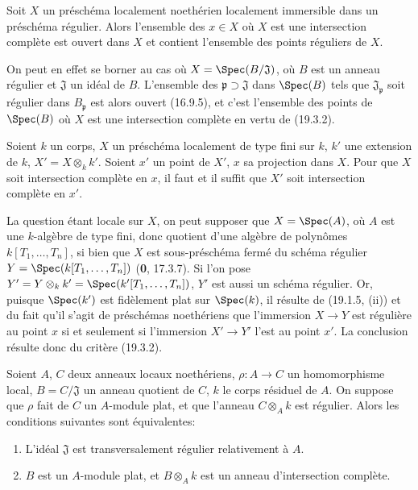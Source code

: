 \begin{corollary}[19.3.3]
\label{IV.19.3.3}
Soit $X$ un préschéma localement noethérien localement immersible dans un préschéma régulier. Alors l'ensemble des $x\in X$ où $X$ est une intersection complète est ouvert dans $X$ et contient l'ensemble des points réguliers de $X$.
\end{corollary}

On peut en effet se borner au cas où $X=\Spec(B/\mathfrak J)$, où $B$ est un anneau régulier et $\mathfrak J$ un idéal de $B$. L'ensemble des $\mathfrak p\supset\mathfrak J$ dans $\Spec(B)$ tels que $\mathfrak J_{\mathfrak p}$ soit régulier dans $B_{\mathfrak p}$ est alors ouvert (16.9.5), et c'est l'ensemble des points de $\Spec(B)$ où $X$ est une intersection complète en vertu de (19.3.2).

\begin{corollary}[19.3.4]
\label{IV.19.3.4}
Soient $k$ un corps, $X$ un préschéma localement de type fini sur $k$, $k'$ une extension de $k$, $X'=X\otimes_k k'$. Soient $x'$ un point de $X'$, $x$ sa projection dans $X$. Pour que $X$ soit intersection complète en $x$, il faut et il suffit que $X'$ soit intersection complète en $x'$.
\end{corollary}

La question étant locale sur $X$, on peut supposer que $X=\Spec(A)$, où $A$ est une $k$-algèbre de type fini, donc quotient d'une algèbre de polynômes $k[T_1,\ldots,T_n]$, si bien que $X$ est sous-préschéma fermé du schéma régulier $Y=\Spec(k[T_1,\ldots,T_n])$ (\textbf{0}, 17.3.7). Si l'on pose $Y'=Y\otimes_k k'=\Spec(k'[T_1,\ldots,T_n])$, $Y'$ est aussi un schéma régulier. Or, puisque $\Spec(k')$ est fidèlement plat sur $\Spec(k)$, il résulte de (19.1.5, (ii)) et du fait qu'il s'agit de préschémas noethériens que l'immersion $X\to Y$ est régulière au point $x$ si et seulement si l'immersion $X'\to Y'$ l'est au point $x'$. La conclusion résulte donc du critère (19.3.2).

\begin{corollary}[19.3.5]
\label{IV.19.3.5}
Soient $A$, $C$ deux anneaux locaux noethériens, $\rho:A\to C$ un homomorphisme local, $B=C/\mathfrak J$ un anneau quotient de $C$, $k$ le corps résiduel de $A$. On suppose que $\rho$ fait de $C$ un $A$-module plat, et que l'anneau $C\otimes_A k$ est régulier. Alors les conditions suivantes sont équivalentes:
\begin{enumerate}
  \item[\textup{a)}] L'idéal $\mathfrak J$ est transversalement régulier relativement à $A$.
  \item[\textup{b)}] $B$ est un $A$-module plat, et $B\otimes_A k$ est un anneau d'intersection complète.
\end{enumerate}
\end{corollary}

